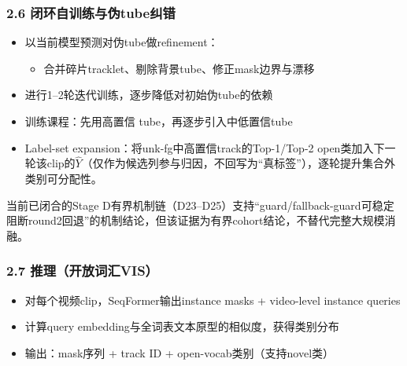 \documentclass[UTF8]{ctexart}
\begin{document}
\subsubsection*{2.6 闭环自训练与伪tube纠错}
\begin{itemize}
\item 以当前模型预测对伪tube做refinement：
\begin{itemize}
\item 合并碎片tracklet、剔除背景tube、修正mask边界与漂移
\end{itemize}
\item 进行1–2轮迭代训练，逐步降低对初始伪tube的依赖
\item 训练课程：先用高置信 tube，再逐步引入中低置信tube
\item Label-set expansion：将unk-fg中高置信track的Top-1/Top-2 open类加入下一轮该clip的$\hat{Y}$（仅作为候选列参与归因，不回写为“真标签”），逐轮提升集合外类别可分配性。
\end{itemize}
当前已闭合的Stage D有界机制链（D23--D25）支持“guard/fallback-guard可稳定阻断round2回退”的机制结论，但该证据为有界cohort结论，不替代完整大规模消融。

\subsubsection*{2.7 推理（开放词汇VIS）}
\begin{itemize}
\item 对每个视频clip，SeqFormer输出instance masks + video-level instance queries
\item 计算query embedding与全词表文本原型的相似度，获得类别分布
\item 输出：mask序列 + track ID + open-vocab类别（支持novel类）
\end{itemize}

\par\noindent\hrulefill\par
\end{document}
